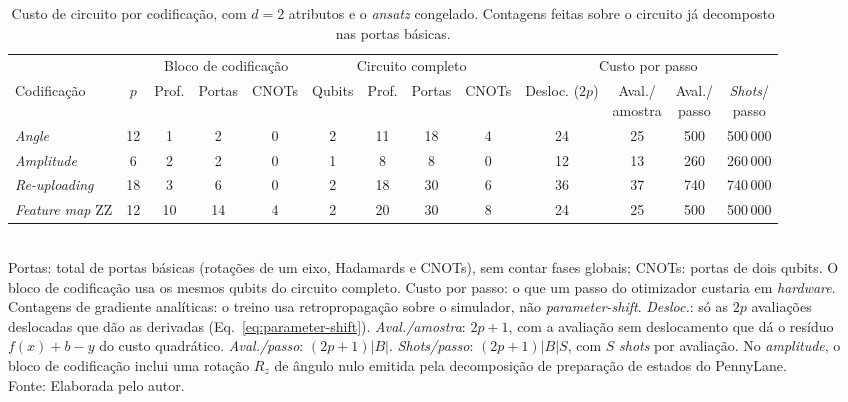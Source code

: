 \begin{table}[htb]
\centering
\footnotesize
\setlength{\tabcolsep}{2pt}
\caption[Custo de circuito por codificação]{Custo de circuito por codificação, com $d = 2$ atributos e o \textit{ansatz} congelado. Contagens feitas sobre o circuito já decomposto nas portas básicas.}
\label{tab:custo}
\begin{tabular}{lcccccccccccc}
\toprule
 &  & \multicolumn{3}{c}{Bloco de codificação} & \multicolumn{4}{c}{Circuito completo} & \multicolumn{4}{c}{Custo por passo} \\
\cmidrule(lr){3-5} \cmidrule(lr){6-9} \cmidrule(lr){10-13}
Codificação & $p$ & Prof. & Portas & CNOTs & Qubits & Prof. & Portas & CNOTs & \shortstack{Desloc.\\($2p$)} & \shortstack{Aval./\\amostra} & \shortstack{Aval./\\passo} & \shortstack{\textit{Shots}/\\passo} \\
\midrule
\textit{Angle} & 12 & 1 & 2 & 0 & 2 & 11 & 18 & 4 & 24 & 25 & 500 & 500\,000 \\
\textit{Amplitude} & 6 & 2 & 2 & 0 & 1 & 8 & 8 & 0 & 12 & 13 & 260 & 260\,000 \\
\textit{Re-uploading} & 18 & 3 & 6 & 0 & 2 & 18 & 30 & 6 & 36 & 37 & 740 & 740\,000 \\
\textit{Feature map} ZZ & 12 & 10 & 14 & 4 & 2 & 20 & 30 & 8 & 24 & 25 & 500 & 500\,000 \\
\bottomrule
\end{tabular}
\\[2pt]
{\footnotesize Portas: total de portas básicas (rotações de um eixo, Hadamards e CNOTs), sem contar fases globais; CNOTs: portas de dois qubits. O bloco de codificação usa os mesmos qubits do circuito completo. Custo por passo: o que um passo do otimizador custaria em \textit{hardware}. Contagens de gradiente analíticas: o treino usa retropropagação sobre o simulador, não \textit{parameter-shift}. \textit{Desloc.}: só as $2p$ avaliações deslocadas que dão as derivadas (Eq.~\eqref{eq:parameter-shift}). \textit{Aval./amostra}: $2p + 1$, com a avaliação sem deslocamento que dá o resíduo $f(x) + b - y$ do custo quadrático. \textit{Aval./passo}: $(2p + 1)|B|$. \textit{Shots/passo}: $(2p + 1)|B|S$, com $S$ \textit{shots} por avaliação. No \textit{amplitude}, o bloco de codificação inclui uma rotação $R_z$ de ângulo nulo emitida pela decomposição de preparação de estados do PennyLane.}
\\[2pt]
{\footnotesize Fonte: Elaborada pelo autor.}
\end{table}
